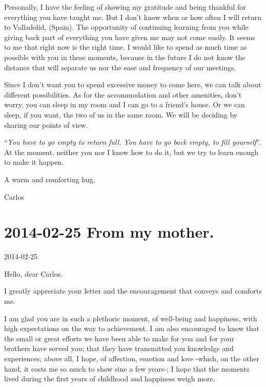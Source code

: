 \documentclass[]{book}
\begin{document}
Personally, I have the feeling of showing my gratitude and being thankful for everything you have taught me. But I don't know when or how often I will return to Valladolid, (Spain). The opportunity of continuing learning from you while giving back part of everything you have given me may not come easily. It seems to me that right now is the right time. I would like to spend as much time as possible with you in these moments, because in the future I do not know the distance that will separate us nor the ease and frequency of our meetings.

Since I don't want you to spend excessive money to come here, we can talk about different possibilities. As for the accommodation and other amenities, don't worry, you can sleep in my room and I can go to a friend's house. Or we can sleep, if you want, the two of us in the same room. We will be deciding by sharing our points of view.

``\emph{You have to go empty to return full. You have to go back empty, to fill yourself}''. At the moment, neither you nor I know how to do it, but we try to learn enough to make it happen.

A warm and comforting hug,

Carlos

\hypertarget{frommother20140225}{%
\section*{2014-02-25 From my mother.}\label{frommother20140225}}

2014-02-25

Hello, dear Carlos.

I greatly appreciate your letter and the encouragement that conveys and comforts me.

I am glad you are in such a plethoric moment, of well-being and happiness, with high expectations on the way to achievement. I am also encouraged to know that the small or great efforts we have been able to make for you and for your brothers have served you; that they have transmitted you knowledge and experiences; above all, I hope, of affection, emotion and love -which, on the other hand, it costs me so much to show sine a few years-; I hope that the moments lived during the first years of childhood and happiness weigh more.
\end{document}
